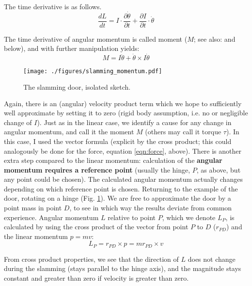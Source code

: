The time derivative is as follows.
\[\frac{dL}{dt} = I \cdot \frac{\partial \dot \theta}{\partial t} + \frac{\partial I}{\partial t} \cdot \dot \theta\]

The time derivative of angular momentum is called moment (\(M\); see also: \citet{WikipediaNewtonEuler,WikipediaTorque} and below), and with further manipulation \citep[details in][p. 242, eqn. 8.23; otherwise see Fig. \ref{fig:miracle}]{Lynch2017} yields:
\begin{equation}\label{eqn:moment}
M = I \ddot\theta + \dot\theta \times I\dot\theta
\end{equation}



\begin{figure}[p]
\centering
\texttt{[image: ./figures/slamming\_momentum.pdf]}
\caption{\label{fig:slamming_momentum}The slamming door, isolated sketch.}
\end{figure}

Again, there is an (angular) velocity product term which we hope to sufficiently well approximate by setting it to zero (rigid body assumption, i.e. no or negligible change of \(I\)).
Just as in the linear case, we identify a cause for any change in angular momentum, and call it the moment \(M\) (others may call it torque \(\tau\)).
In this case, I used the vector formula (explicit by the cross product; this could analogously be done for the force, equation \eqref{eqn:force}, above).
There is another extra step compared to the linear momentum: calculation of the \textbf{angular momentum requires a reference point} (usually the hinge, \(P\), as above, but any point could be chosen).
The calculated angular momentum actually changes depending on which reference point is chosen.
Returning to the example of the door, rotating on a hinge (Fig. \ref{fig:slamming_momentum}).
We are free to approximate the door by a point mass in point \(D\), to see in which way the results deviate from common experience.
Angular momentum \(L\) relative to point \(P\), which we denote \(L_P\), is calculated by using the cross product of the vector from point \(P\) to \(D\) (\(r_{PD}\)) and the linear momentum \(p=mv\):
\[L_{P} = r_{PD} \times p = m r_{PD} \times v \]

From cross product properties, we see that the direction of \(L\) does not change during the slamming (stays parallel to the hinge axis), and the magnitude stays constant and greater than zero if velocity is greater than zero.

